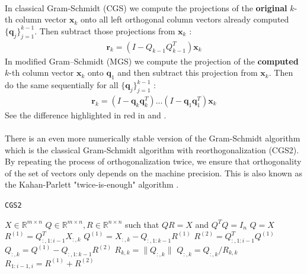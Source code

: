 \paragraph*{}
In classical Gram-Schmidt (CGS) we compute the projections of the \textbf{original} $k$-th column vector $\mathbf{x}_k$ onto all left orthogonal column vectors already computed $\{\mathbf{q}_{j}\}_{j=1}^{k-1}$. Then subtract those projections from $\mathbf{x}_k$ :
\begin{align}
    \mathbf{r}_k = (I - Q_{k-1} Q_{k-1}^T)\mathbf{x}_k
\end{align}
In modified Gram–Schmidt (MGS) we compute the projection of the \textbf{computed} $k$-th column vector $\mathbf{x}_k$ onto $\mathbf{q}_1$ and then subtract this projection from $\mathbf{x}_k$. Then do the same sequentially for all $\{\mathbf{q}_{j}\}_{j=1}^{k-1}$ :
\begin{align}
    \mathbf{r}_k = (I - \mathbf{q}_k\mathbf{q}_k^T)...(I - \mathbf{q}_1\mathbf{q}_1^T)\mathbf{x}_k
\end{align}
See the difference highlighted in red in  and .

\paragraph*{}
There is an even more numerically stable version of the Gram-Schmidt algorithm which is the classical Gram-Schmidt algorithm with reorthogonalization (CGS2). By repeating the process of orthogonalization twice, we ensure that orthogonality of the set of vectors only depends on the machine precision. This is also known as the Kahan-Parlett "twice-is-enough" algorithm \cite{Parlett1998}.

\begin{algorithm}
\caption{\texttt{CGS2}}\label{alg:cgs2}
\begin{algorithmic}[1]
\Require $X \in \mathbb{R}^{m\times n}$
\Ensure $ Q \in \mathbb{R}^{m\times n}, R \in \mathbb{R}^{n\times n}$ such that $QR = X$ and $Q^TQ=I_n$
\State $Q = X$
    \State $R^{(1)} = Q_{:,1:i-1}^T X_{:,k}$ 
    \State $Q^{(1)} = X_{:,k} - Q_{:,1:k-1} R^{(1)}$
    \State $R^{(2)} = Q_{:,1:i-1}^T Q^{(1)}$ 
    \State $Q_{:,k} = Q^{(1)} - Q_{:,1:k-1} R^{(2)}$
    \State $R_{k,k} = \lVert Q_{:,k} \rVert$
    \State $Q_{:,k} = Q_{:,k}/R_{k,k}$
    \State $R_{1:i-1,i} = R^{(1)} + R^{(2)}$
\EndFor
\end{algorithmic}
\end{algorithm}

